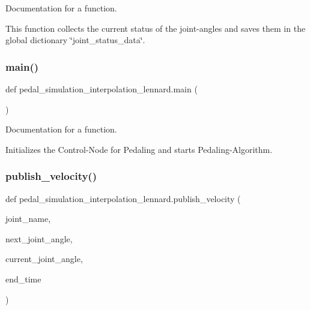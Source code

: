 Documentation for a function. 

This function collects the current status of the joint-\/angles and saves them in the global dictionary \char`\"{}joint\+\_\+status\+\_\+data\char`\"{}. \mbox{\label{namespacepedal__simulation__interpolation__lennard_a29ca8543b538f5084be3465159234d94}} 
\subsubsection{\texorpdfstring{main()}{main()}}
{\footnotesize\ttfamily def pedal\+\_\+simulation\+\_\+interpolation\+\_\+lennard.\+main (\begin{DoxyParamCaption}{ }\end{DoxyParamCaption})}



Documentation for a function. 

Initializes the Control-\/\+Node for Pedaling and starts Pedaling-\/\+Algorithm. \mbox{\label{namespacepedal__simulation__interpolation__lennard_a2c1393a71ebf4ef7da408eb959e9a8ad}} 
\subsubsection{\texorpdfstring{publish\_velocity()}{publish\_velocity()}}
{\footnotesize\ttfamily def pedal\+\_\+simulation\+\_\+interpolation\+\_\+lennard.\+publish\+\_\+velocity (\begin{DoxyParamCaption}\item[{}]{joint\+\_\+name,  }\item[{}]{next\+\_\+joint\+\_\+angle,  }\item[{}]{current\+\_\+joint\+\_\+angle,  }\item[{}]{end\+\_\+time }\end{DoxyParamCaption})}



